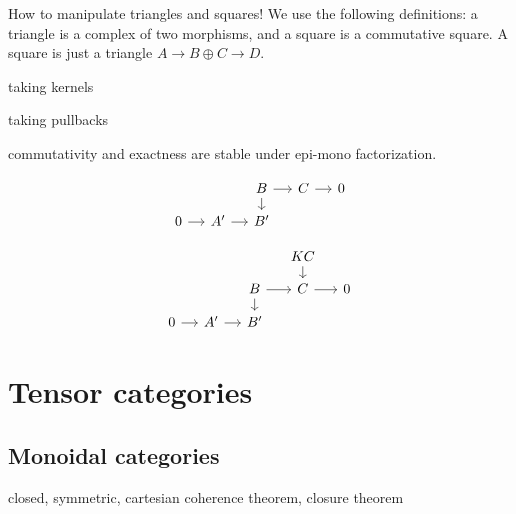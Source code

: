 \documentclass{../../large}
\begin{document}
How to manipulate triangles and squares!
We use the following definitions: a triangle is a complex of two morphisms, and a square is a commutative square.
A square is just a triangle $A\to B\oplus C\to D$.

taking kernels

taking pullbacks

commutativity and exactness are stable under epi-mono factorization.

\[\begin{tikzcd}[sep=small]
&& B\rar\dar & C \rar & 0\\
0 \rar & A' \rar & B' &&
\end{tikzcd}\]

\[\begin{tikzcd}[sep=small]
&&& KC \dar &\\
&& B\rar\dar & C \rar & 0\\
0 \rar & A' \rar & B' &&
\end{tikzcd}\]



\chapter{Tensor categories}



\section{Monoidal categories}
closed, symmetric, cartesian
coherence theorem, closure theorem
\end{document}
